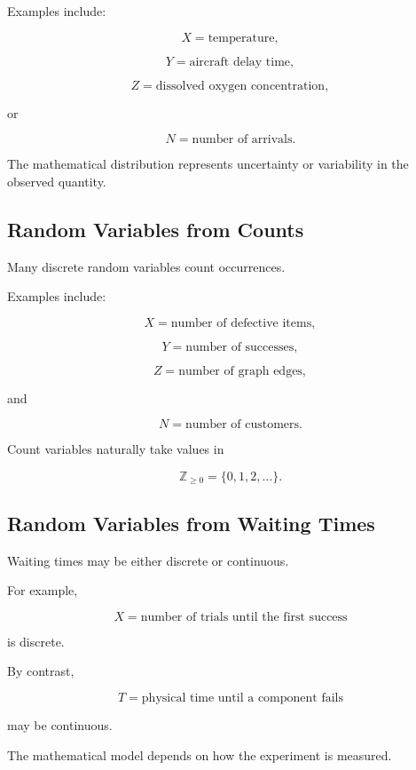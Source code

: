 Examples include:

\[
X
=
\text{temperature},
\]

\[
Y
=
\text{aircraft delay time},
\]

\[
Z
=
\text{dissolved oxygen concentration},
\]

or

\[
N
=
\text{number of arrivals}.
\]

The mathematical distribution represents uncertainty or variability in
the observed quantity.

\subsection{Random Variables from Counts}
\label{subsec:rv-counts}

Many discrete random variables count occurrences.

Examples include:

\[
X
=
\text{number of defective items},
\]

\[
Y
=
\text{number of successes},
\]

\[
Z
=
\text{number of graph edges},
\]

and

\[
N
=
\text{number of customers}.
\]

Count variables naturally take values in

\[
\boxed{
\mathbb{Z}_{\geq0}
=
\{0,1,2,\ldots\}.
}
\]

\subsection{Random Variables from Waiting Times}
\label{subsec:rv-waiting-times}

Waiting times may be either discrete or continuous.

For example,

\[
X
=
\text{number of trials until the first success}
\]

is discrete.

By contrast,

\[
T
=
\text{physical time until a component fails}
\]

may be continuous.

The mathematical model depends on how the experiment is measured.

